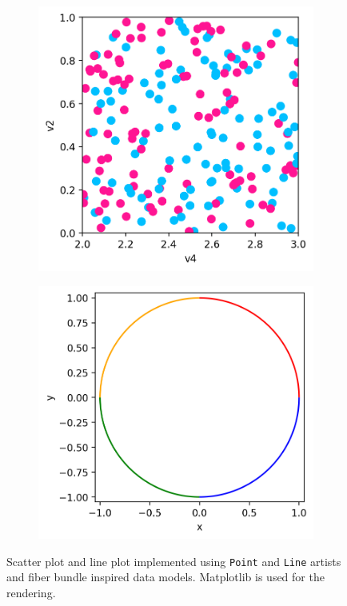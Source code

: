 \documentclass[../main.tex]{subfiles}
\begin{document}
 \begin{figure}[H]
    \centering 
    \begin{subfigure}{.49\textwidth}
        \includegraphics[width=\textwidth]{figures/code/scatter_0.png}
        \caption{}
        \label{fig:code:scatter}
    \end{subfigure}
    \begin{subfigure}{.48\textwidth}
        \includegraphics[width=\textwidth]{figures/code/line_1.png}
        \caption{}
        \label{fig:code:line}
    \end{subfigure}
  \caption{Scatter plot and line plot implemented using \texttt{Point} and \texttt{Line} artists and fiber bundle inspired data models. Matplotlib is used for the rendering.}
  \label{fig:code:scatter_line}
\end{figure}
\end{document}
